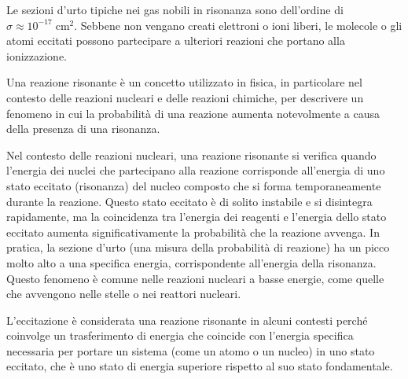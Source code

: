 Le sezioni d'urto tipiche nei gas nobili in risonanza sono dell'ordine di $\sigma \approx 10^{-17} \; \text{cm}^2$. Sebbene non vengano creati elettroni o ioni liberi, le molecole o gli atomi eccitati possono partecipare a ulteriori reazioni che portano alla ionizzazione.

\begin{approfondimento}
   \footnotesize
   Una reazione risonante è un concetto utilizzato in fisica, in particolare nel contesto delle reazioni nucleari e delle reazioni chimiche, per descrivere un fenomeno in cui la probabilità di una reazione aumenta notevolmente a causa della presenza di una risonanza.
   
   Nel contesto delle reazioni nucleari, una reazione risonante si verifica quando l'energia dei nuclei che partecipano alla reazione corrisponde all'energia di uno stato eccitato (risonanza) del nucleo composto che si forma temporaneamente durante la reazione. Questo stato eccitato è di solito instabile e si disintegra rapidamente, ma la coincidenza tra l'energia dei reagenti e l'energia dello stato eccitato aumenta significativamente la probabilità che la reazione avvenga. In pratica, la sezione d'urto (una misura della probabilità di reazione) ha un picco molto alto a una specifica energia, corrispondente all'energia della risonanza. Questo fenomeno è comune nelle reazioni nucleari a basse energie, come quelle che avvengono nelle stelle o nei reattori nucleari.

   L'eccitazione è considerata una reazione risonante in alcuni contesti perché coinvolge un trasferimento di energia che coincide con l'energia specifica necessaria per portare un sistema (come un atomo o un nucleo) in uno stato eccitato, che è uno stato di energia superiore rispetto al suo stato fondamentale.


\end{approfondimento}
